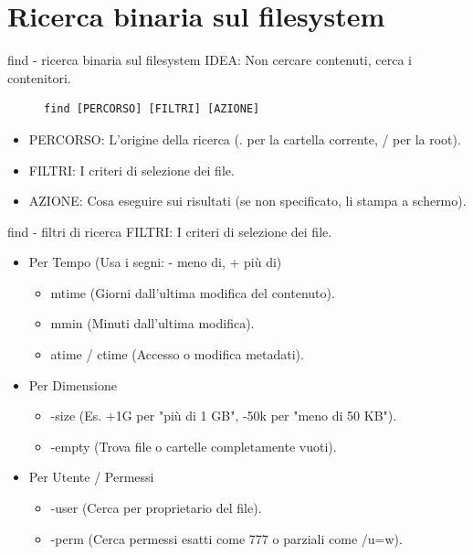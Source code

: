 \section{Ricerca binaria sul filesystem}
\begin{frame}[fragile]{find - ricerca binaria sul filesystem}
  IDEA: Non cercare contenuti, cerca i contenitori.
\begin{figure}
\begin{lstlisting}
find [PERCORSO] [FILTRI] [AZIONE]
\end{lstlisting}
\end{figure}

	\begin{itemize}
		\item PERCORSO: L'origine della ricerca (. per la cartella corrente, / per la root).
		\item FILTRI: I criteri di selezione dei file.
		\item AZIONE: Cosa eseguire sui risultati (se non specificato, li stampa a schermo).
	\end{itemize}
\end{frame}

\begin{frame}[fragile]{find - filtri di ricerca}
 FILTRI: I criteri di selezione dei file.
		\begin{itemize}
			\item Per Tempo (Usa i segni: - meno di, + più di)
			\begin{itemize}
				\item mtime (Giorni dall'ultima modifica del contenuto).
				\item mmin (Minuti dall'ultima modifica).
				\item atime / ctime (Accesso o modifica metadati).
			\end{itemize}
			\item Per Dimensione
			\begin{itemize}
				\item -size (Es. +1G per "più di 1 GB", -50k per "meno di 50 KB").
				\item -empty (Trova file o cartelle completamente vuoti).
			\end{itemize}
			\item Per Utente / Permessi
			\begin{itemize}
			\item -user (Cerca per proprietario del file).
			\item -perm (Cerca permessi esatti come 777 o parziali come /u=w).
			\end{itemize}
		\end{itemize} 	
\end{frame}

